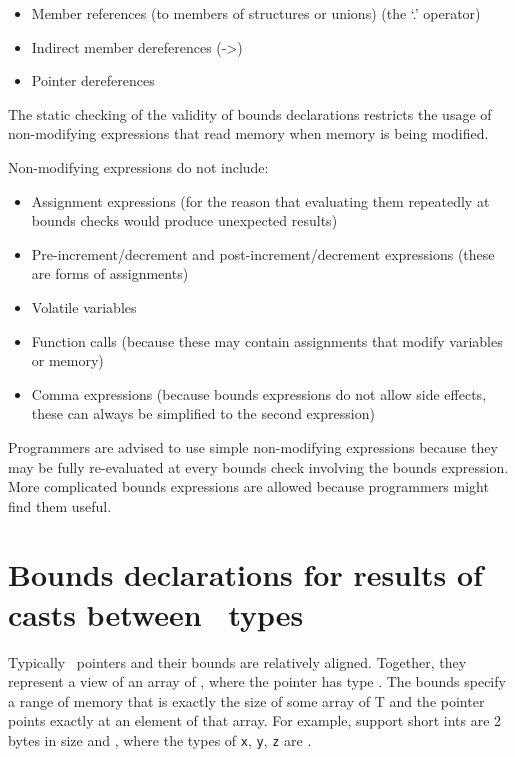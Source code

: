 \begin{itemize}
\item
  Member references (to members of structures or unions) (the `.'
  operator)
\item
  Indirect member dereferences (-\textgreater{})
\end{itemize}

\begin{itemize}
\item
  Pointer dereferences
\end{itemize}

The static checking of the validity of bounds declarations restricts the
usage of non-modifying expressions that read memory when memory is being
modified.

Non-modifying expressions do not include:

\begin{itemize}
\item
  Assignment expressions (for the reason that evaluating them repeatedly
  at bounds checks would produce unexpected results)
\item
  Pre-increment/decrement and post-increment/decrement expressions
  (these are forms of assignments)
\item
  Volatile variables
\item
  Function calls (because these may contain assignments that modify
  variables or memory)
\item
  Comma expressions (because bounds expressions do not allow side
  effects, these can always be simplified to the second expression)
\end{itemize}

Programmers are advised to use simple non-modifying expressions because
they may be fully re-evaluated at every bounds check involving the
bounds expression. More complicated bounds expressions are allowed
because programmers might find them useful.

\section{Bounds declarations for results of casts between \arrayptr\ types}

Typically \arrayptr\ pointers and their bounds are relatively
aligned. Together, they represent a view of an array of , where
the pointer has type
\arrayptrT. The
bounds specify a range of memory that is exactly the size of some array
of T and the pointer points exactly at an element of that array. For
example, support short ints are 2 bytes in size and 
{\texttt{}}, where the types of \texttt{x},
\texttt{y}, \texttt{z} are  .

